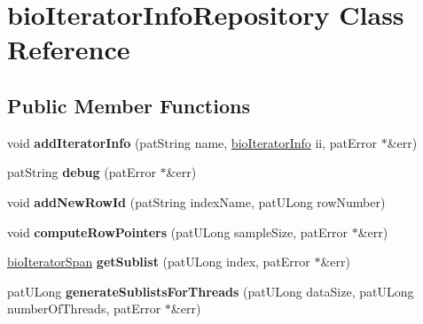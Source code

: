 \hypertarget{classbio_iterator_info_repository}{}\section{bio\+Iterator\+Info\+Repository Class Reference}
\label{classbio_iterator_info_repository}
\subsection*{Public Member Functions}
\begin{DoxyCompactItemize}
\item 
\mbox{\label{classbio_iterator_info_repository_a591b9af4c98eaf7f977a8a3e588a1247}} 
void {\bfseries add\+Iterator\+Info} (pat\+String name, \hyperlink{classbio_iterator_info}{bio\+Iterator\+Info} ii, pat\+Error $\ast$\&err)
\item 
\mbox{\label{classbio_iterator_info_repository_a7ed467b0ae149a1766f21858e345f954}} 
pat\+String {\bfseries debug} (pat\+Error $\ast$\&err)
\item 
\mbox{\label{classbio_iterator_info_repository_ab4c27922d63fb825caaba8ac89a27887}} 
void {\bfseries add\+New\+Row\+Id} (pat\+String index\+Name, pat\+U\+Long row\+Number)
\item 
\mbox{\label{classbio_iterator_info_repository_ae7bcfd8cb23d3faedc75812b8f03bde5}} 
void {\bfseries compute\+Row\+Pointers} (pat\+U\+Long sample\+Size, pat\+Error $\ast$\&err)
\item 
\mbox{\label{classbio_iterator_info_repository_a397294a546166b459268d2e408a7276b}} 
\hyperlink{classbio_iterator_span}{bio\+Iterator\+Span} {\bfseries get\+Sublist} (pat\+U\+Long index, pat\+Error $\ast$\&err)
\item 
\mbox{\label{classbio_iterator_info_repository_a95bdc3777d900538b900aed96d3ab1a9}} 
pat\+U\+Long {\bfseries generate\+Sublists\+For\+Threads} (pat\+U\+Long data\+Size, pat\+U\+Long number\+Of\+Threads, pat\+Error $\ast$\&err)
\item 

\end{DoxyCompactItemize}
